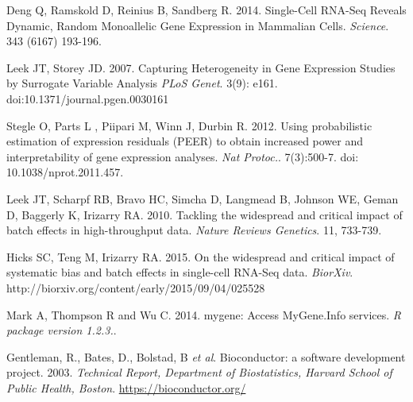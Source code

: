 \documentclass[10pt,letterpaper]{article}
\begin{document}
\begin{thebibliography}{9}
Deng Q,  Ramskold D,  Reinius B,  Sandberg R. 2014.
Single-Cell RNA-Seq Reveals Dynamic, Random Monoallelic Gene Expression in Mammalian Cells.
\textit{Science}.  343 (6167) 193-196.


Leek JT,  Storey JD. 2007.
Capturing Heterogeneity in Gene Expression Studies by Surrogate Variable Analysis
\textit{PLoS Genet}. 3(9): e161. doi:10.1371/journal.pgen.0030161

Stegle O,  Parts L ,  Piipari M,  Winn J,  Durbin R. 2012.
Using probabilistic estimation of expression residuals (PEER) to obtain increased power and interpretability of gene expression analyses.
\textit{Nat Protoc.}. 7(3):500-7. doi: 10.1038/nprot.2011.457.


Leek JT,  Scharpf RB,  Bravo HC,  Simcha D,  Langmead B,  Johnson WE,  Geman D,  Baggerly K,  Irizarry RA. 2010.
Tackling the widespread and critical impact of batch effects in high-throughput data.
\textit{Nature Reviews Genetics}. 11, 733-739.

Hicks SC, Teng M, Irizarry RA. 2015.
On the widespread and critical impact of systematic bias and batch effects in single-cell RNA-Seq data.
\textit{BiorXiv}. http://biorxiv.org/content/early/2015/09/04/025528


Mark A, Thompson R and Wu C.  2014.
mygene: Access MyGene.Info services.
\textit{R package version 1.2.3.}.

Gentleman, R., Bates, D., Bolstad, B \textit{et al}.
 Bioconductor: a software development project. 2003.
 \textit{Technical Report, Department of Biostatistics, Harvard
School of Public Health, Boston}. \url{https://bioconductor.org/}

%



\end{thebibliography}
\end{document}
